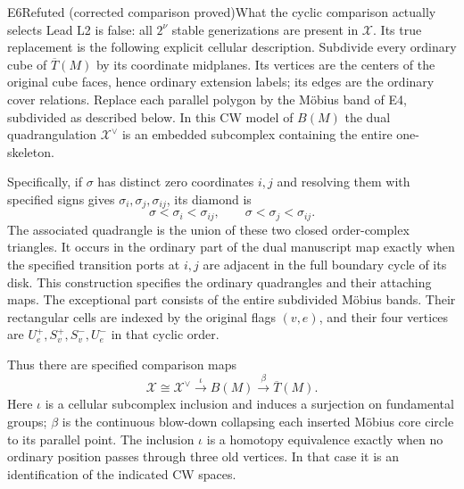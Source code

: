 \begin{resultenv}{E6}{Refuted (corrected comparison proved)}{What the cyclic comparison actually selects}
Lead L2 is false: all $2^\nu$ stable generizations are present in
$\mathcal X$. Its true replacement is the following explicit cellular
description. Subdivide every ordinary cube of $\overline T(M)$ by its
coordinate midplanes. Its vertices are the centers of the original cube
faces, hence ordinary extension labels; its edges are the ordinary cover
relations. Replace each parallel polygon by the M\"obius band of E4,
subdivided as described below. In this CW model of $B(M)$ the dual
quadrangulation $\mathcal X^\vee$ is an embedded subcomplex containing
the entire one-skeleton.

Specifically, if $\sigma$ has distinct zero coordinates $i,j$ and resolving them
with specified signs gives $\sigma_i,\sigma_j,\sigma_{ij}$, its diamond is
\[
 \sigma<\sigma_i<\sigma_{ij},\qquad
 \sigma<\sigma_j<\sigma_{ij}.
\]
The associated quadrangle is the union of these two closed order-complex
triangles. It occurs in the ordinary part of the dual manuscript map
exactly when the specified transition ports at $i,j$ are adjacent in the
full boundary cycle of its disk. This construction specifies the ordinary
quadrangles and their attaching maps. The exceptional part consists of
the entire subdivided M\"obius bands. Their rectangular cells are indexed
by the original flags $(v,e)$, and their four vertices are
$U_e^+,S_v^+,S_v^-,U_e^-$ in that cyclic order.

Thus there are specified comparison maps
\[
 \mathcal X\cong\mathcal X^\vee
 \xrightarrow{\ \iota\ }B(M)
 \xrightarrow{\ \beta\ }\overline T(M).
\]
Here $\iota$ is a cellular subcomplex inclusion and induces a surjection on
fundamental groups; $\beta$ is the continuous blow-down collapsing each inserted M\"obius core circle
to its parallel point. The inclusion $\iota$ is a homotopy equivalence
exactly when no ordinary position passes through three old vertices.
In that case it is an identification of the indicated CW spaces.
\end{resultenv}
